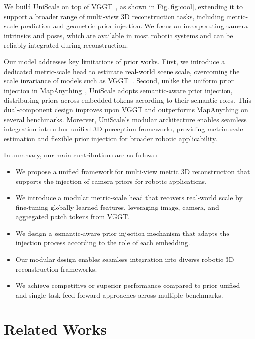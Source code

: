 \documentclass[letterpaper, 10 pt, conference]{ieeeconf}  %
\begin{document}
We build UniScale on top of VGGT~\cite{wang2025vggt}, as shown in Fig.\ref{fig:cool}, extending it to support a broader range of multi-view 3D reconstruction tasks, including metric-scale prediction and geometric prior injection. We focus on incorporating camera intrinsics and poses, which are available in most robotic systems and can be reliably integrated during reconstruction. 

Our model addresses key limitations of prior works. First, we introduce a dedicated metric-scale head to estimate real-world scene scale, overcoming the scale invariance of models such as VGGT~\cite{wang2025vggt}. Second, unlike the uniform prior injection in MapAnything~\cite{keetha2025mapanything}, UniScale adopts semantic-aware prior injection, distributing priors across embedded tokens according to their semantic roles. This dual-component design improves upon VGGT and outperforms MapAnything on several benchmarks. Moreover, UniScale’s modular architecture enables seamless integration into other unified 3D perception frameworks, providing metric-scale estimation and flexible prior injection for broader robotic applicability.

In summary, our main contributions are as follows:
\begin{itemize}
    \item We propose a unified framework for multi-view metric 3D reconstruction that supports the injection of camera priors for robotic applications.
    \item We introduce a modular metric-scale head that recovers real-world scale by fine-tuning globally learned features, leveraging image, camera, and aggregated patch tokens from VGGT.
    \item We design a semantic-aware prior injection mechanism that adapts the injection process according to the role of each embedding.
    \item Our modular design enables seamless integration into diverse robotic 3D reconstruction frameworks.
    \item We achieve competitive or superior performance compared to prior unified and single-task feed-forward approaches across multiple benchmarks.
\end{itemize}


\vspace{-1mm}

\section{Related Works}
\end{document}
